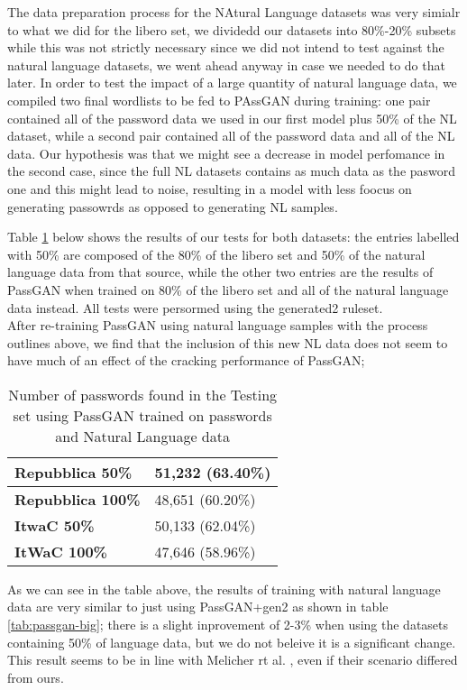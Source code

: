 The data preparation process for the NAtural Language datasets was very simialr to what we did for the libero set, we dividedd our datasets into 80\%-20\% subsets while this was not strictly necessary since we did not intend to test against the natural language datasets, we went ahead anyway in case we needed to do that later. In order to test the impact of a large quantity of natural language data, we compiled two final wordlists to be fed to PAssGAN during training: one pair contained all of the password data we used in our first model plus 50\% of the NL dataset, while a second pair contained all of the password data and all of the NL data. Our hypothesis was that we might see a decrease in model perfomance in the second case, since the full NL datasets contains as much data as the pasword one and this might lead to noise, resulting in a model with less foocus on generating passowrds as opposed to generating NL samples.

Table \ref{tab:nl-results} below shows the results of our tests for both datasets: the entries labelled with 50\% are composed of the 80\% of the libero set and 50\% of the natural language data from that source, while the other two entries are the results of PassGAN when trained on 80\% of the libero set and all of the natural language data instead. All tests were persormed using the generated2 ruleset.\\
After re-training PassGAN using natural language samples with the process outlines above, we find that the inclusion of this new NL data does not seem to have much of an effect of the cracking performance of PassGAN;


\begin{table}[H]
\centering
\begin{tabular}{|l|l|}
\hline
\textbf{Repubblica 50\%} & 51,232 (63.40\%) \\ \hline
\textbf{Repubblica 100\%} & 48,651 (60.20\%)  \\ \hline
\textbf{ItwaC 50\%} & 50,133 (62.04\%)  \\ \hline
\textbf{ItWaC 100\%} & 47,646 (58.96\%)  \\ \hline
\end{tabular}
\caption{Number of passwords found in the Testing set using PassGAN trained on passwords and Natural Language data}
\label{tab:nl-results}
\end{table}

As we can see in the table above, the results of training with natural language data are very similar to just using PassGAN+gen2 as shown in table \ref{tab:passgan-big}; there is a slight inprovement of 2-3\% when using the datasets containing 50\% of language data, but we do not beleive it is a significant change. This result seems to be in line with Melicher rt al. \cite{Melicher2016}, even if their scenario differed from ours.

